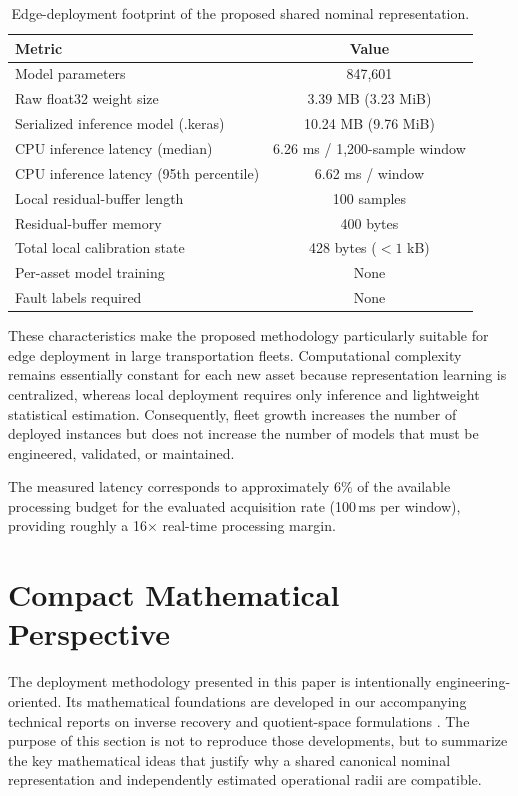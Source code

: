 \documentclass[11pt,a4paper]{article}
\begin{document}
\begin{table}[H]
\centering
\caption{Edge-deployment footprint of the proposed shared nominal representation.}
\label{tab:edge}
\begin{tabular}{lc}
\toprule
Metric & Value \\
\midrule
Model parameters & 847,601 \\
Raw float32 weight size & 3.39 MB (3.23 MiB) \\
Serialized inference model (.keras) & 10.24 MB (9.76 MiB) \\
CPU inference latency (median) & 6.26 ms / 1,200-sample window \\
CPU inference latency (95th percentile) & 6.62 ms / window \\
Local residual-buffer length & 100 samples \\
Residual-buffer memory & 400 bytes \\
Total local calibration state & 428 bytes ($<1$ kB) \\
Per-asset model training & None \\
Fault labels required & None \\
\bottomrule
\end{tabular}
\end{table}

These characteristics make the proposed methodology particularly suitable for edge deployment in
large transportation fleets. Computational complexity remains essentially constant for each new
asset because representation learning is centralized, whereas local deployment requires only
inference and lightweight statistical estimation. Consequently, fleet growth increases the number
of deployed instances but does not increase the number of models that must be engineered,
validated, or maintained.

The measured latency corresponds to approximately 6\% of the available processing budget for the
evaluated acquisition rate (100\,ms per window), providing roughly a 16$\times$ real-time
processing margin.

\section{Compact Mathematical Perspective}
\label{sec:theory}

The deployment methodology presented in this paper is intentionally engineering-oriented.
Its mathematical foundations are developed in our accompanying technical reports on inverse
recovery and quotient-space formulations
\cite{disanti2026inverse,disanti2026quotient}. The purpose of this section is not to reproduce
those developments, but to summarize the key mathematical ideas that justify why a shared
canonical nominal representation and independently estimated operational radii are compatible.
\end{document}

